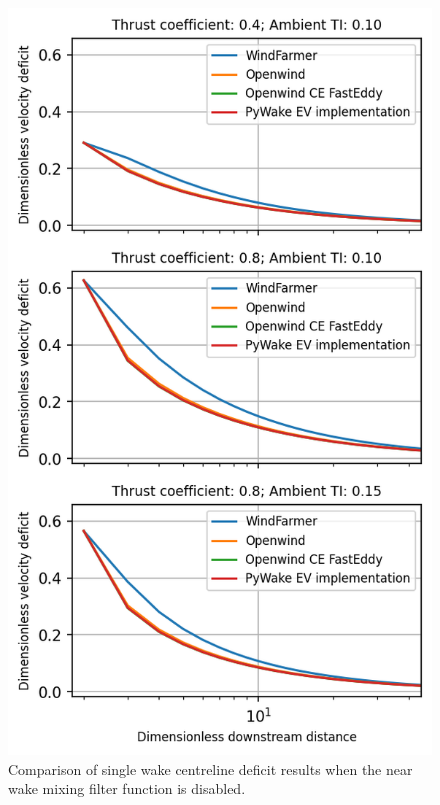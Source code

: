 \documentclass[11pt,a4paper]{article}
\begin{document}
\begin{figure}
	\centering
		\includegraphics{wake_recovery_results_comparison_no_mixing_function.png}
	\caption{Comparison of single wake centreline deficit results when the near wake mixing filter function is disabled.}
	\label{fig:wake_recovery_results_comparison_no_mixing_function}
\end{figure}

\printbibliography
\end{document}
